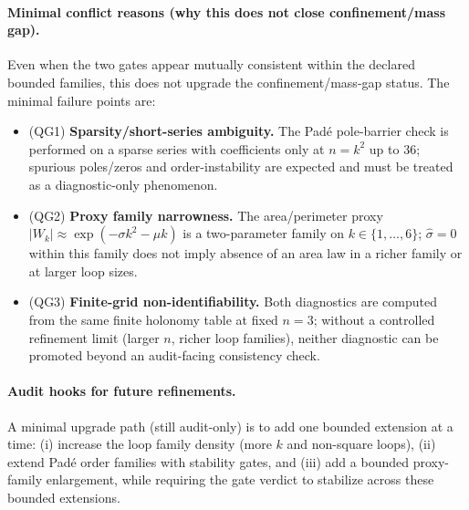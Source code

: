 \paragraph{Minimal conflict reasons (why this does not close confinement/mass gap).}
\AuditTag Even when the two gates appear mutually consistent within the declared bounded families, this does not upgrade the confinement/mass-gap status.
The minimal failure points are:
\begin{itemize}
\item (QG1) \textbf{Sparsity/short-series ambiguity.} The Pad\'e pole-barrier check is performed on a sparse series with coefficients only at $n=k^2$ up to $36$; spurious poles/zeros and order-instability are expected and must be treated as a diagnostic-only phenomenon.
\item (QG2) \textbf{Proxy family narrowness.} The area/perimeter proxy $|W_k|\approx \exp(-\sigma k^2-\mu k)$ is a two-parameter family on $k\in\{1,\dots,6\}$; $\widehat\sigma=0$ within this family does not imply absence of an area law in a richer family or at larger loop sizes.
\item (QG3) \textbf{Finite-grid non-identifiability.} Both diagnostics are computed from the same finite holonomy table at fixed $n=3$; without a controlled refinement limit (larger $n$, richer loop families), neither diagnostic can be promoted beyond an audit-facing consistency check.
\end{itemize}

\paragraph{Audit hooks for future refinements.}
\AuditTag A minimal upgrade path (still audit-only) is to add one bounded extension at a time:
(i) increase the loop family density (more $k$ and non-square loops), (ii) extend Pad\'e order families with stability gates, and (iii) add a bounded proxy-family enlargement, while requiring the gate verdict to stabilize across these bounded extensions.